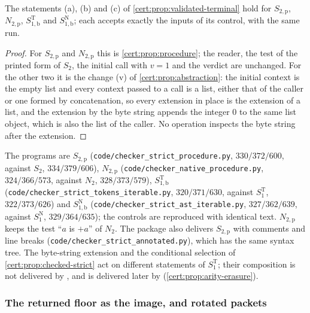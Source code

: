 \begin{proposition}\label{cert:prop:validated-devices}
The statements (a), (b) and (c) of \cref{cert:prop:validated-terminal} hold for
$S_{2,\mathrm p}$, $N_{2,\mathrm p}$, $S^{\mathrm T}_{1,\mathrm b}$ and
$S^{\mathrm N}_{1,\mathrm b}$; each accepts exactly the inputs of its control,
with the same run.
\end{proposition}
\begin{proof}
For $S_{2,\mathrm p}$ and $N_{2,\mathrm p}$ this is \cref{cert:prop:procedure}; the
reader, the test of the printed form of $S_2$, the initial call with $v=1$ and
the verdict are unchanged. For the other two it is the change (v) of
\cref{cert:prop:abstraction}: the initial context is the empty list and every
context passed to a call is a list, either that of the caller or one formed by
concatenation, so every extension in place is the extension of a list, and the
extension by the byte string appends the integer $0$ to the same list object,
which is also the list of the caller. No operation inspects the byte string after
the extension.
\end{proof}

The programs are $S_{2,\mathrm p}$ (\texttt{code/checker\_strict\_procedure.py},
$330/372/600$, against $S_2$, $334/379/606$), $N_{2,\mathrm p}$
(\texttt{code/checker\_native\_procedure.py}, $324/366/573$, against $N_2$,
$328/373/579$), $S^{\mathrm T}_{1,\mathrm b}$
(\texttt{code/checker\_strict\_tokens\_iterable.py}, $320/371/630$, against
$S^{\mathrm T}_1$, $322/373/626$) and $S^{\mathrm N}_{1,\mathrm b}$
(\texttt{code/checker\_strict\_ast\_iterable.py}, $327/362/639$, against
$S^{\mathrm N}_1$, $329/364/635$); the controls are reproduced with identical
text. $N_{2,\mathrm p}$ keeps the test ``$a$ is $+a$'' of $N_2$. The package also
delivers $S_{2,\mathrm p}$ with comments and line breaks
(\texttt{code/checker\_strict\_annotated.py}), which has the same syntax tree.
The byte-string extension and the conditional selection of
\cref{cert:prop:checked-strict} act on different statements of $S^{\mathrm T}_1$;
their composition is not delivered by , and is
delivered later by 
(\cref{cert:prop:arity-erasure}).

\subsubsection*{The returned floor as the image, and rotated packets}

